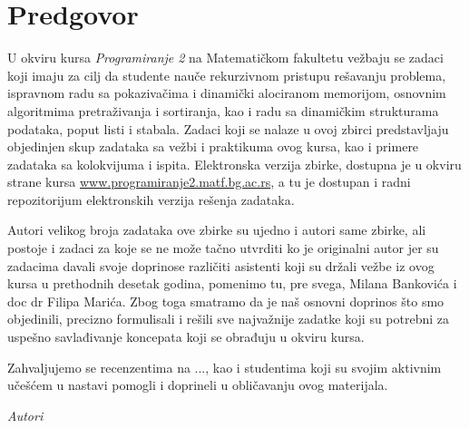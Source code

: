 
\chapter*{Predgovor}

U okviru kursa {\em Programiranje 2} na Matematičkom fakultetu vežbaju se zadaci 
koji imaju za cilj da studente nauče rekurzivnom pristupu rešavanju problema, 
ispravnom radu sa pokazivačima i dinamički alociranom memorijom,  osnovnim algoritmima 
pretraživanja i sortiranja, kao i radu sa dinamičkim strukturama podataka, 
poput listi i stabala. Zadaci koji se nalaze u ovoj zbirci predstavljaju 
objedinjen skup zadataka sa vežbi i praktikuma ovog kursa, kao i primere 
zadataka sa kolokvijuma i ispita. Elektronska verzija zbirke, dostupna je u okviru
strane kursa \url{www.programiranje2.matf.bg.ac.rs}, a tu je dostupan i radni 
repozitorijum elektronskih verzija rešenja zadataka.

Autori velikog broja zadataka ove zbirke su ujedno i autori same zbirke, ali postoje 
i zadaci za koje se ne može tačno utvrditi ko je originalni autor jer su zadacima 
davali svoje doprinose različiti asistenti koji su držali vežbe iz ovog kursa u 
prethodnih desetak godina, pomenimo tu, pre svega, Milana Bankovića i doc dr 
Filipa Marića. Zbog toga smatramo da je naš osnovni doprinos što smo objedinili, 
precizno formulisali i rešili sve najvažnije zadatke koji su potrebni za 
uspešno savlađivanje koncepata koji se obrađuju u okviru kursa. 

Zahvaljujemo se recenzentima na ..., kao i studentima koji su svojim aktivnim 
učešćem u nastavi pomogli i doprineli u obličavanju ovog materijala.  




\bigskip

\begin{flushright}
{\em Autori}
\end{flushright}
